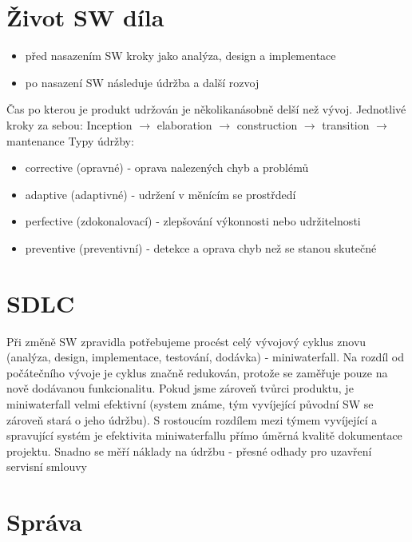 \documentclass{szzclass}
\begin{document}
\tableofcontents
\newpage

\section{Život SW díla}
\begin{itemize}
    \item před nasazením SW kroky jako analýza, design a implementace
    \item po nasazení SW následuje údržba a další rozvoj
\end{itemize}
Čas po kterou je produkt udržován je několikanásobně delší než vývoj. Jednotlivé kroky za sebou:
\newline
Inception $\rightarrow$ elaboration $\rightarrow$ construction $\rightarrow$ transition $\rightarrow$ mantenance
\newline
Typy údržby:
\begin{itemize}
    \item corrective (opravné) - oprava nalezených chyb a problémů
    \item adaptive (adaptivné) - udržení v měnícím se prostřdedí
    \item perfective (zdokonalovací) - zlepšování výkonnosti nebo udržitelnosti
    \item preventive (preventivní) - detekce a oprava chyb než se stanou skutečné
\end{itemize}

\section{SDLC}
Při změně SW zpravidla potřebujeme procést celý vývojový cyklus znovu (analýza, design, implementace, testování, dodávka) - miniwaterfall.
\newline
Na rozdíl od počátečního vývoje je cyklus značně redukován, protože se zaměřuje pouze na nově dodávanou funkcionalitu.
\newline
Pokud jsme zároveň tvůrci produktu, je miniwaterfall velmi efektivní (system známe, tým vyvíjející původní SW se zároveň stará o jeho údržbu).
\newline
S rostoucím rozdílem mezi týmem vyvíjející a spravující systém je efektivita miniwaterfallu přímo úměrná kvalitě dokumentace projektu.
\newline
Snadno se měří náklady na údržbu - přesné odhady pro uzavření servisní smlouvy

\section{Správa}
\end{document}
